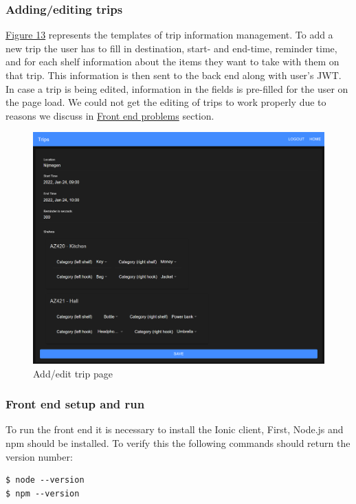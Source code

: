 \documentclass{article}
\begin{document}
\subsubsection{Adding/editing trips}
\hyperref[fig:add-trip]{Figure 13} represents the templates of trip information management. To add a new trip the user has to fill in destination, start- and end-time, reminder time, and for each shelf information about the items they want to take with them on that trip. This information is then sent to the back end along with user's JWT. In case a trip is being edited, information in the fields is pre-filled for the user on the page load. We could not get the editing of trips to work properly  due to reasons we discuss in \hyperref[sec:front]{Front end problems} section.
\begin{figure}[H]
    \begin{center}
        \includegraphics[width=1\textwidth]{Front-End/Trips.png}
    \end{center}
    \caption{Add/edit trip page}
    \label{fig:add-trip}
\end{figure}

\subsubsection{Front end setup and run}
To run the front end it is necessary to install the Ionic client, First, Node.js and npm should be installed. To verify this the following commands should return the version number:
\begin{lstlisting}
$ node --version
$ npm --version
\end{lstlisting}
\end{document}
